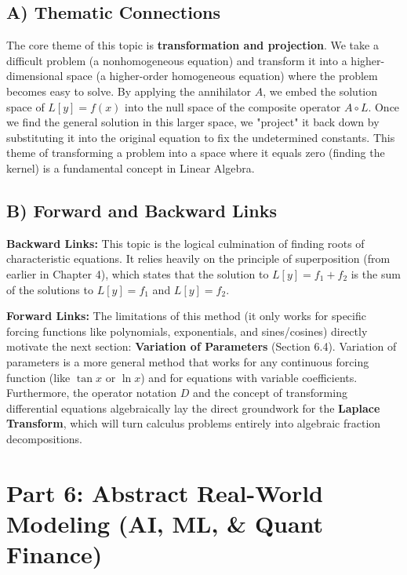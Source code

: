 \documentclass[11pt]{article}
\begin{document}
\subsection{A) Thematic Connections}
The core theme of this topic is \textbf{transformation and projection}. We take a difficult problem (a nonhomogeneous equation) and transform it into a higher-dimensional space (a higher-order homogeneous equation) where the problem becomes easy to solve. 
By applying the annihilator $A$, we embed the solution space of $L[y] = f(x)$ into the null space of the composite operator $A \circ L$. Once we find the general solution in this larger space, we "project" it back down by substituting it into the original equation to fix the undetermined constants. This theme of transforming a problem into a space where it equals zero (finding the kernel) is a fundamental concept in Linear Algebra.

\subsection{B) Forward and Backward Links}
\textbf{Backward Links:} This topic is the logical culmination of finding roots of characteristic equations. It relies heavily on the principle of superposition (from earlier in Chapter 4), which states that the solution to $L[y] = f_1 + f_2$ is the sum of the solutions to $L[y] = f_1$ and $L[y] = f_2$.

\textbf{Forward Links:} The limitations of this method (it only works for specific forcing functions like polynomials, exponentials, and sines/cosines) directly motivate the next section: \textbf{Variation of Parameters} (Section 6.4). Variation of parameters is a more general method that works for any continuous forcing function (like $\tan x$ or $\ln x$) and for equations with variable coefficients. Furthermore, the operator notation $D$ and the concept of transforming differential equations algebraically lay the direct groundwork for the \textbf{Laplace Transform}, which will turn calculus problems entirely into algebraic fraction decompositions.

\newpage
\section{Part 6: Abstract Real-World Modeling (AI, ML, \& Quant Finance)}
\end{document}
